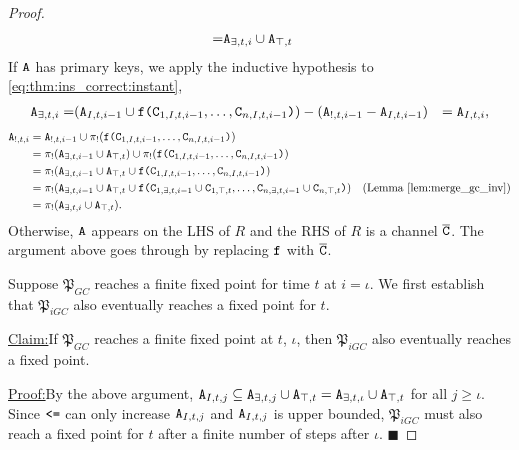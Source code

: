 \documentclass{article}
\numberwithin{equation}{section}
\newenvironment{claim}[1]{\par\noindent\underline{Claim:}\space#1}{}
\newenvironment{claimproof}[1]{\par\noindent\underline{Proof:}\space#1}{\hfill $\blacksquare$}
\renewcommand{\tt}[1]{\ifmmode\text{\texttt{#1}}\else\texttt{#1}\fi}
\begin{document}
\begin{proof}
\begin{align*}
=& \tt{A}_{\exists,t,i} \cup \tt{A}_{\top,t}
\end{align*}
If $\tt{A}$ has primary keys, we apply the inductive hypothesis to \eqref{eq:thm:ins_correct:instant},
\begin{align*}
\tt{A}_{\exists,t,i}
=& (\tt{A}_{I,t,i-1} \cup \tt{f}\tt{(}\tt{C}_{1,I,t,i-1}, \dots, \tt{C}_{n,I,t,i-1}\tt{)}) - (\tt{A}_{!,t,i-1} - \tt{A}_{I,t,i-1})
&= \tt{A}_{I,t,i},
\end{align*}
\begin{align*}
\tt{A}_{!,t,i}
&= \tt{A}_{!,t,i-1} \cup \pi_!(\tt{f}\tt{(}\tt{C}_{1,I,t,i-1}, \dots, \tt{C}_{n,I,t,i-1}\tt{)})\\
&= \pi_!(\tt{A}_{\exists,t,i-1} \cup \tt{A}_{\top,t}) \cup \pi_!(\tt{f}\tt{(}\tt{C}_{1,I,t,i-1}, \dots, \tt{C}_{n,I,t,i-1}\tt{)})\\
&= \pi_!(\tt{A}_{\exists,t,i-1} \cup \tt{A}_{\top,t} \cup \tt{f}\tt{(}\tt{C}_{1,I,t,i-1}, \dots, \tt{C}_{n,I,t,i-1}\tt{)})\\
&= \pi_!(\tt{A}_{\exists,t,i-1} \cup \tt{A}_{\top,t} \cup \tt{f}\tt{(}\tt{C}_{1,\exists,t,i-1} \cup \tt{C}_{1,\top,t}, \dots, \tt{C}_{n,\exists,t,i-1} \cup \tt{C}_{n,\top,t}\tt{)}) & \text{(Lemma \ref{lem:merge_gc_inv})}\\
&= \pi_!(\tt{A}_{\exists,t,i} \cup \tt{A}_{\top,t}).
\end{align*}
Otherwise, $\tt{A}$ appears on the LHS of $R$ and the RHS of $R$ is a channel $\overline{\tt{C}}$.
The argument above goes through by replacing $\tt{f}$ with $\overline{\tt{C}}$.

Suppose $\mathfrak{P}_{GC}$ reaches a finite fixed point for time $t$ at $i=\iota$.
We first establish that $\mathfrak{P}_{iGC}$ also eventually reaches a fixed point for $t$.
\begin{claim}
If $\mathfrak{P}_{GC}$ reaches a finite fixed point at $t$, $\iota$, then $\mathfrak{P}_{iGC}$ also eventually reaches a fixed point.
\end{claim}
\begin{claimproof}
By the above argument, $\tt{A}_{I,t,j} \subseteq \tt{A}_{\exists,t,j} \cup \tt{A}_{\top,t} = \tt{A}_{\exists,t,\iota} \cup \tt{A}_{\top,t}$ for all $j \geq \iota$.
Since $\tt{<=}$ can only increase $\tt{A}_{I,t,j}$ and $\tt{A}_{I,t,j}$ is upper bounded, $\mathfrak{P}_{iGC}$ must also reach a fixed point for $t$ after a finite number of steps after $\iota$.
\end{claimproof}


\end{proof}
\end{document}
